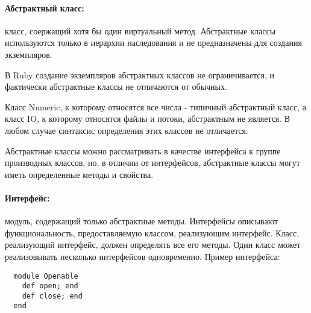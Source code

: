 \paragraph*{Абстрактный класс:} класс, соержащий хотя бы один виртуальный метод. Абстрактные классы используются только в иерархии наследования и не предназначены для создания экземпляров.

В Ruby создание экземпляров абстрактных классов не ограничивается, и фактически абстрактные классы не отличаются от обычных.
\begin{note}
  Класс Numeric, к которому относятся все числа - типичный абстрактный класс, а класс IO, к которому относятся файлы и потоки, абстрактным не является. В любом случае синтаксис определения этих классов не отличается.
\end{note}

Абстрактные классы можно рассматривать в качестве интерфейса к группе производных классов, но, в отличии от интерфейсов, абстрактные классы могут иметь определенные методы и свойства.

\paragraph*{Интерфейс:} модуль, содержащий только абстрактные методы. Интерфейсы описывают функциональность, предоставляемую классом, реализующим интерфейс. Класс, реализующий интерфейс, должен определять все его методы. Один класс может реализовывать несколько интерфейсов одновременно.
Пример интерфейса:
\begin{verbatim}
  module Openable
    def open; end
    def close; end
  end
\end{verbatim}